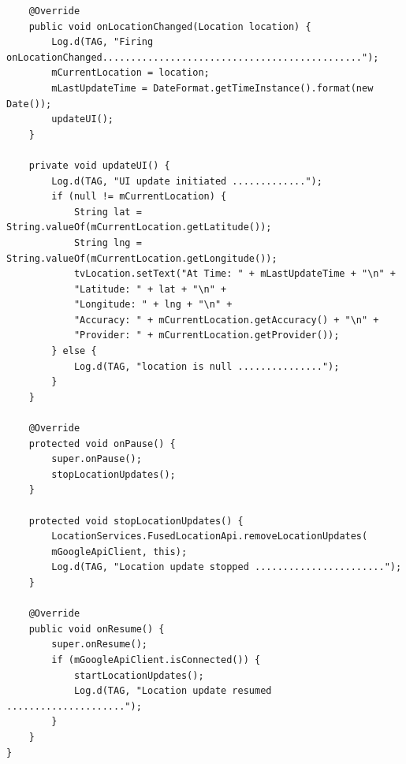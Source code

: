 \documentclass[a4paper,12pt]{article}
\begin{document}
\begin{lstlisting}
	@Override
	public void onLocationChanged(Location location) {
		Log.d(TAG, "Firing onLocationChanged..............................................");
		mCurrentLocation = location;
		mLastUpdateTime = DateFormat.getTimeInstance().format(new Date());
		updateUI();
	}
	
	private void updateUI() {
		Log.d(TAG, "UI update initiated .............");
		if (null != mCurrentLocation) {
			String lat = String.valueOf(mCurrentLocation.getLatitude());
			String lng = String.valueOf(mCurrentLocation.getLongitude());
			tvLocation.setText("At Time: " + mLastUpdateTime + "\n" +
			"Latitude: " + lat + "\n" +
			"Longitude: " + lng + "\n" +
			"Accuracy: " + mCurrentLocation.getAccuracy() + "\n" +
			"Provider: " + mCurrentLocation.getProvider());
		} else {
			Log.d(TAG, "location is null ...............");
		}
	}
	
	@Override
	protected void onPause() {
		super.onPause();
		stopLocationUpdates();
	}
	
	protected void stopLocationUpdates() {
		LocationServices.FusedLocationApi.removeLocationUpdates(
		mGoogleApiClient, this);
		Log.d(TAG, "Location update stopped .......................");
	}
	
	@Override
	public void onResume() {
		super.onResume();
		if (mGoogleApiClient.isConnected()) {
			startLocationUpdates();
			Log.d(TAG, "Location update resumed .....................");
		}
	}
}
\end{lstlisting}
\end{document}
